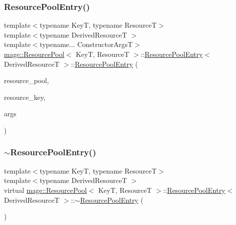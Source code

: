 \subsubsection{\texorpdfstring{Resource\+Pool\+Entry()}{ResourcePoolEntry()}\hspace{0.1cm}{\footnotesize\ttfamily [1/3]}}
{\footnotesize\ttfamily template$<$typename KeyT, typename ResourceT$>$ \\
template$<$typename Derived\+ResourceT $>$ \\
template$<$typename... Constructor\+ArgsT$>$ \\
\hyperlink{classmage_1_1_resource_pool}{mage\+::\+Resource\+Pool}$<$ KeyT, ResourceT $>$\+::\hyperlink{structmage_1_1_resource_pool_1_1_resource_pool_entry}{Resource\+Pool\+Entry}$<$ Derived\+ResourceT $>$\+::\hyperlink{structmage_1_1_resource_pool_1_1_resource_pool_entry}{Resource\+Pool\+Entry} (\begin{DoxyParamCaption}\item[{\hyperlink{classmage_1_1_resource_pool}{Resource\+Pool}$<$ KeyT, ResourceT $>$ \&}]{resource\+\_\+pool,  }\item[{KeyT}]{resource\+\_\+key,  }\item[{Constructor\+ArgsT \&\&...}]{args }\end{DoxyParamCaption})}

\hypertarget{structmage_1_1_resource_pool_1_1_resource_pool_entry_ae8d7b54f633fb865e2c299d2fd2bf466}{}\label{structmage_1_1_resource_pool_1_1_resource_pool_entry_ae8d7b54f633fb865e2c299d2fd2bf466} 
\subsubsection{\texorpdfstring{$\sim$\+Resource\+Pool\+Entry()}{~ResourcePoolEntry()}}
{\footnotesize\ttfamily template$<$typename KeyT, typename ResourceT$>$ \\
template$<$typename Derived\+ResourceT $>$ \\
virtual \hyperlink{classmage_1_1_resource_pool}{mage\+::\+Resource\+Pool}$<$ KeyT, ResourceT $>$\+::\hyperlink{structmage_1_1_resource_pool_1_1_resource_pool_entry}{Resource\+Pool\+Entry}$<$ Derived\+ResourceT $>$\+::$\sim$\hyperlink{structmage_1_1_resource_pool_1_1_resource_pool_entry}{Resource\+Pool\+Entry} (\begin{DoxyParamCaption}{ }\end{DoxyParamCaption})\hspace{0.3cm}{\ttfamily [virtual]}}

